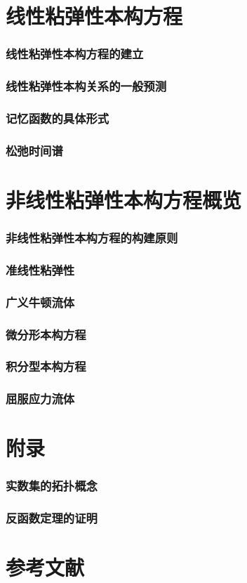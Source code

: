 \documentclass[zihao=-4,linespread=1.5,heading=true,a4paper,twoside]{ctexart}
\begin{document}
\newpage\part{线性粘弹性本构方程}
\section{线性粘弹性本构方程的建立}

\section{线性粘弹性本构关系的一般预测}

\section{记忆函数的具体形式}

\section{松弛时间谱}

\newpage\part{非线性粘弹性本构方程概览}
\section{非线性粘弹性本构方程的构建原则}
\section{准线性粘弹性}
\section{广义牛顿流体}
\section{微分形本构方程}
\section{积分型本构方程}
\section{屈服应力流体}

\newpage\part{附录}
\section{实数集的拓扑概念}


\section{反函数定理的证明}\label{sect:VI.2}


\newpage\part*{参考文献}
\printbibliography[heading=none]
\end{document}
